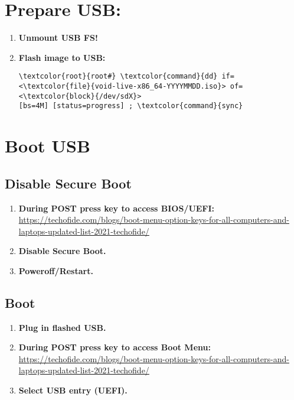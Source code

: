 \documentclass[10pt, a4paper, onecolumn, oneside, titlepage, openany]{book}
\begin{document}
\section{Prepare USB:}
\begin{enumerate}
    \item \textbf{Unmount USB FS!}
    \item \textbf{Flash image to USB:}
\begin{Verbatim}[commandchars=\\\{\}]
\textcolor{root}{root#} \textcolor{command}{dd} if=<\textcolor{file}{void-live-x86_64-YYYYMMDD.iso}> of=<\textcolor{block}{/dev/sdX}>
[bs=4M] [status=progress] ; \textcolor{command}{sync}
\end{Verbatim}
\end{enumerate}


\section{Boot USB}
\subsection{Disable Secure Boot}
\begin{enumerate}
    \item \textbf{During POST press key to access BIOS/UEFI:}
\newline \href{https://techofide.com/blogs/boot-menu-option-keys-for-all-computers-and-laptops-updated-list-2021-techofide/}{https://techofide.com/blogs/boot-menu-option-keys-for-all-computers-and-laptops-updated-list-2021-techofide/}
    \item \textbf{Disable Secure Boot.}
    \item \textbf{Poweroff/Restart.}
\end{enumerate}
\subsection{Boot}
\begin{enumerate}
    \item \textbf{Plug in flashed USB.}
    \item \textbf{During POST press key to access Boot Menu:}
\newline \href{https://techofide.com/blogs/boot-menu-option-keys-for-all-computers-and-laptops-updated-list-2021-techofide/}{https://techofide.com/blogs/boot-menu-option-keys-for-all-computers-and-laptops-updated-list-2021-techofide/}
    \item \textbf{Select USB entry (UEFI).}
\end{enumerate}
\end{document}
